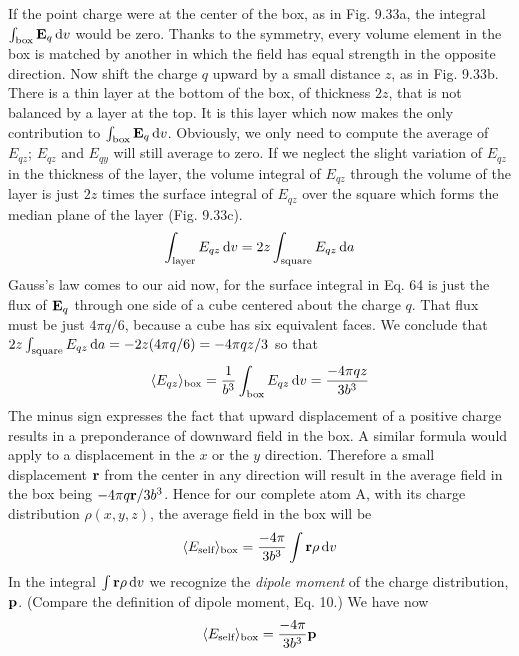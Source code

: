 If the point charge were at the center of the box, as in Fig. 9.33a,
the integral $\int_\text{box} \mathbf{E}_q\operatorname{d\!} v$ would be zero. Thanks to the symmetry,
every volume element in the box is matched by another in which the
field has equal strength in the opposite direction. Now shift the
charge $q$ upward by a small distance $z$, as in Fig. 9.33b. There is a
thin layer at the bottom of the box, of thickness $2z$, that is not balanced
by a layer at the top. It is this layer which now makes the only
contribution to $\int_\text{box} \mathbf{E}_q\operatorname{d\!} v$. Obviously, we only need to compute the
average of $E_{qz}$; $E_{qz}$ and $E_{qy}$ will still average to zero. If we neglect the
slight variation of $E_{qz}$ in the thickness of the layer, the volume integral
of $E_{qz}$ through the volume of the layer is just $2z$ times the 
surface integral of $E_{qz}$ over the square which forms the median plane
of the layer (Fig. 9.33c).
\begin{equation}
  \int_\text{layer} E_{qz}\operatorname{d\!} v = 2z \int_\text{square} E_{qz}\operatorname{d\!} a
\end{equation}
Gauss's law comes to our aid now, for the surface integral in Eq. 64
is just the flux of $\mathbf{E}_q$ through one side of a cube centered about the
charge $q$. That flux must be just $4\pi q/6$, because a cube has six 
equivalent faces. We conclude that $2z \int_\text{square} E_{qz}\operatorname{d\!} a=-2z(4\pi q/6)
=-4\pi qz/3$ so that
\begin{equation}
  \langle E_{qz}\rangle_\text{box} = \frac{1}{b^3} \int_\text{box} E_{qz}\operatorname{d\!} v = \frac{-4\pi qz}{3 b^3}
\end{equation}
The minus sign expresses the fact that upward displacement of a
positive charge results in a preponderance of downward field in the
box. A similar formula would apply to a displacement in the $x$ or
the $y$ direction. Therefore a small displacement $\mathbf{r}$ from the center in
any direction will result in the average field in the box being
$-4\pi q\mathbf{r}/3b^3$. Hence for our complete atom A, with its charge distribution
$\rho(x,y,z)$, the average field in the box will be
\begin{equation}
  \langle E_\text{self}\rangle_\text{box} = \frac{-4\pi}{3b^3} \int\mathbf{r}\rho\operatorname{d\!} v
\end{equation}
In the integral $\int\mathbf{r}\rho\operatorname{d\!} v$ we recognize the \emph{dipole moment} of the
charge distribution, $\mathbf{p}$. (Compare the definition of dipole moment,
Eq. 10.) We have now
\begin{equation}
  \langle E_\text{self}\rangle_\text{box} = \frac{-4\pi}{3b^3}\mathbf{p}
\end{equation}

